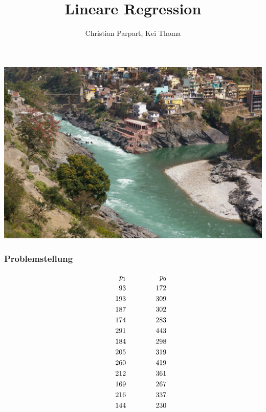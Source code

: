 \documentclass{beamer}
\author{Christian Parpart, Kei Thoma}
\title{Lineare Regression}
\begin{document}
\begin{frame}
    \maketitle
\end{frame}

\begin{frame}
    \includegraphics[width=\textwidth]{confluence.jpg}
\end{frame}

\begin{frame}
    \frametitle{Problemstellung}
    \small
    \begin{alignat*}{5}
           && p_1 &&     && && p_0 \\
        {\color{white}a +}&& 93  &&   {\color{white}b} &&{\color{white}=}&& 172 \\
        {\color{white}a +}&& 193 &&   {\color{white}b} &&{\color{white}=}&& 309 \\
        {\color{white}a +}&& 187 &&   {\color{white}b} &&{\color{white}=}&& 302 \\
        {\color{white}a +}&& 174 &&   {\color{white}b} &&{\color{white}=}&& 283 \\
        {\color{white}a +}&& 291 &&   {\color{white}b} &&{\color{white}=}&& 443 \\
        {\color{white}a +}&& 184 &&   {\color{white}b} &&{\color{white}=}&& 298 \\
        {\color{white}a +}&& 205 &&   {\color{white}b} &&{\color{white}=}&& 319 \\
        {\color{white}a +}&& 260 &&   {\color{white}b} &&{\color{white}=}&& 419 \\
        {\color{white}a +}&& 212 &&   {\color{white}b} &&{\color{white}=}&& 361 \\
        {\color{white}a +}&& 169 &&   {\color{white}b} &&{\color{white}=}&& 267 \\
        {\color{white}a +}&& 216 &&   {\color{white}b} &&{\color{white}=}&& 337 \\
        {\color{white}a +}&& 144 &&   {\color{white}b} &&{\color{white}=}&& 230
    \end{alignat*}
\end{frame}
\end{document}

